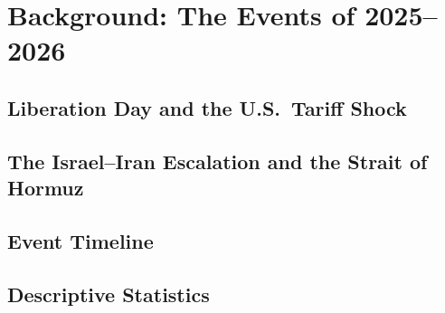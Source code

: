 
\chapter{Background: The Events of 2025--2026}
\label{ch:background}



\section{Liberation Day and the U.S.\ Tariff Shock}
\label{sec:bg_tariff}



\section{The Israel--Iran Escalation and the Strait of Hormuz}
\label{sec:bg_iran}



\section{Event Timeline}
\label{sec:bg_timeline}




\section{Descriptive Statistics}
\label{sec:bg_descriptive}

